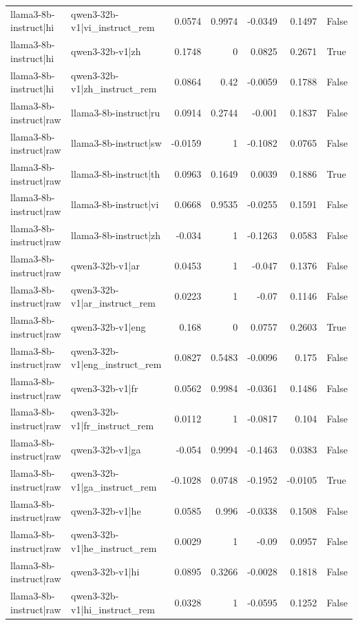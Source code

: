 \begin{table}
\begin{tabular}{l l r r r r l}
llama3-8b-instruct|hi & qwen3-32b-v1|vi_instruct_rem & 0.0574 & 0.9974 & -0.0349 & 0.1497 & False \\
llama3-8b-instruct|hi & qwen3-32b-v1|zh & 0.1748 & 0 & 0.0825 & 0.2671 & True \\
llama3-8b-instruct|hi & qwen3-32b-v1|zh_instruct_rem & 0.0864 & 0.42 & -0.0059 & 0.1788 & False \\
llama3-8b-instruct|raw & llama3-8b-instruct|ru & 0.0914 & 0.2744 & -0.001 & 0.1837 & False \\
llama3-8b-instruct|raw & llama3-8b-instruct|sw & -0.0159 & 1 & -0.1082 & 0.0765 & False \\
llama3-8b-instruct|raw & llama3-8b-instruct|th & 0.0963 & 0.1649 & 0.0039 & 0.1886 & True \\
llama3-8b-instruct|raw & llama3-8b-instruct|vi & 0.0668 & 0.9535 & -0.0255 & 0.1591 & False \\
llama3-8b-instruct|raw & llama3-8b-instruct|zh & -0.034 & 1 & -0.1263 & 0.0583 & False \\
llama3-8b-instruct|raw & qwen3-32b-v1|ar & 0.0453 & 1 & -0.047 & 0.1376 & False \\
llama3-8b-instruct|raw & qwen3-32b-v1|ar_instruct_rem & 0.0223 & 1 & -0.07 & 0.1146 & False \\
llama3-8b-instruct|raw & qwen3-32b-v1|eng & 0.168 & 0 & 0.0757 & 0.2603 & True \\
llama3-8b-instruct|raw & qwen3-32b-v1|eng_instruct_rem & 0.0827 & 0.5483 & -0.0096 & 0.175 & False \\
llama3-8b-instruct|raw & qwen3-32b-v1|fr & 0.0562 & 0.9984 & -0.0361 & 0.1486 & False \\
llama3-8b-instruct|raw & qwen3-32b-v1|fr_instruct_rem & 0.0112 & 1 & -0.0817 & 0.104 & False \\
llama3-8b-instruct|raw & qwen3-32b-v1|ga & -0.054 & 0.9994 & -0.1463 & 0.0383 & False \\
llama3-8b-instruct|raw & qwen3-32b-v1|ga_instruct_rem & -0.1028 & 0.0748 & -0.1952 & -0.0105 & True \\
llama3-8b-instruct|raw & qwen3-32b-v1|he & 0.0585 & 0.996 & -0.0338 & 0.1508 & False \\
llama3-8b-instruct|raw & qwen3-32b-v1|he_instruct_rem & 0.0029 & 1 & -0.09 & 0.0957 & False \\
llama3-8b-instruct|raw & qwen3-32b-v1|hi & 0.0895 & 0.3266 & -0.0028 & 0.1818 & False \\
llama3-8b-instruct|raw & qwen3-32b-v1|hi_instruct_rem & 0.0328 & 1 & -0.0595 & 0.1252 & False \\

\end{tabular}
\end{table}
